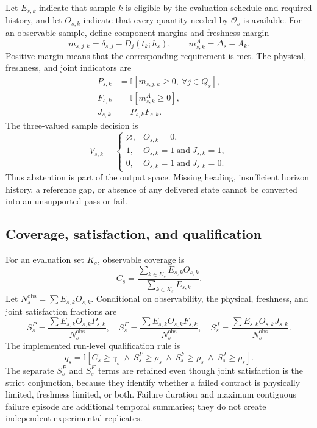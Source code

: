 \documentclass[journal,onecolumn]{IEEEtran}
\begin{document}
Let $E_{s,k}$ indicate that sample $k$ is eligible by the evaluation schedule and required history, and let $O_{s,k}$ indicate that every quantity needed by $\mathcal{O}_s$ is available. For an observable sample, define component margins and freshness margin
\begin{equation}
m_{s,j,k}=\delta_{s,j}-D_j(t_k;h_s),
\qquad
m^A_{s,k}=\Delta_s-A_k.
\end{equation}
Positive margin means that the corresponding requirement is met. The physical, freshness, and joint indicators are
\begin{align}
P_{s,k}&=\mathbb{I}[m_{s,j,k}\ge0,\ \forall j\in Q_s],\\
F_{s,k}&=\mathbb{I}[m^A_{s,k}\ge0],\\
J_{s,k}&=P_{s,k}F_{s,k}.
\end{align}
The three-valued sample decision is
\begin{equation}
V_{s,k}=
\begin{cases}
\varnothing, & O_{s,k}=0,\\
1, & O_{s,k}=1\ \text{and}\ J_{s,k}=1,\\
0, & O_{s,k}=1\ \text{and}\ J_{s,k}=0.
\end{cases}
\end{equation}
Thus abstention is part of the output space. Missing heading, insufficient horizon history, a reference gap, or absence of any delivered state cannot be converted into an unsupported pass or fail.

\subsection{Coverage, satisfaction, and qualification}
For an evaluation set $K_s$, observable coverage is
\begin{equation}
C_s=
\frac{\sum_{k\in K_s}E_{s,k}O_{s,k}}
{\sum_{k\in K_s}E_{s,k}}.
\end{equation}
Let $N_s^{\mathrm{obs}}=\sum E_{s,k}O_{s,k}$. Conditional on observability, the physical, freshness, and joint satisfaction fractions are
\begin{equation}
S_s^P=\frac{\sum E_{s,k}O_{s,k}P_{s,k}}{N_s^{\mathrm{obs}}},\quad
S_s^F=\frac{\sum E_{s,k}O_{s,k}F_{s,k}}{N_s^{\mathrm{obs}}},\quad
S_s^J=\frac{\sum E_{s,k}O_{s,k}J_{s,k}}{N_s^{\mathrm{obs}}}.
\end{equation}
The implemented run-level qualification rule is
\begin{equation}
q_s=\mathbb{I}\!\left[
C_s\ge\gamma_s\ \land\
S_s^P\ge\rho_s\ \land\
S_s^F\ge\rho_s\ \land\
S_s^J\ge\rho_s
\right].
\end{equation}
The separate $S_s^P$ and $S_s^F$ terms are retained even though joint satisfaction is the strict conjunction, because they identify whether a failed contract is physically limited, freshness limited, or both. Failure duration and maximum contiguous failure episode are additional temporal summaries; they do not create independent experimental replicates.
\end{document}
